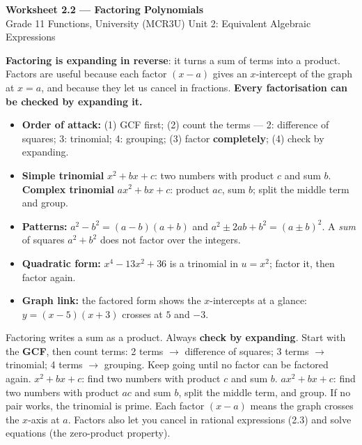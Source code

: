 \documentclass[11pt]{article}
\begin{document}
\begin{center}
{\LARGE\bfseries\color{titleblue}Worksheet 2.2 --- Factoring Polynomials}\\[2pt]
{\small Grade 11 Functions, University (MCR3U) \textperiodcentered{} Unit 2: Equivalent Algebraic Expressions}
\end{center}

\begin{ideabox}
\textbf{Factoring is expanding in reverse}: it turns a sum of terms into a product. Factors are useful because each factor $(x-a)$ gives an $x$-intercept of the graph at $x=a$, and because they let us cancel in fractions. \textbf{Every factorisation can be checked by expanding it.}
\begin{itemize}[leftmargin=*,itemsep=2pt]
  \item \textbf{Order of attack:} (1) GCF first; (2) count the terms --- 2: difference of squares; 3: trinomial; 4: grouping; (3) factor \textbf{completely}; (4) check by expanding.
  \item \textbf{Simple trinomial} $x^2+bx+c$: two numbers with product $c$ and sum $b$. \textbf{Complex trinomial} $ax^2+bx+c$: product $ac$, sum $b$; split the middle term and group.
  \item \textbf{Patterns:} $a^2-b^2=(a-b)(a+b)$ and $a^2\pm2ab+b^2=(a\pm b)^2$. A \emph{sum} of squares $a^2+b^2$ does not factor over the integers.
  \item \textbf{Quadratic form:} $x^4-13x^2+36$ is a trinomial in $u=x^2$; factor it, then factor again.
  \item \textbf{Graph link:} the factored form shows the $x$-intercepts at a glance: $y=(x-5)(x+3)$ crosses at $5$ and $-3$.
\end{itemize}
\end{ideabox}

\begin{learnbox}
Factoring writes a sum as a product. Always \textbf{check by expanding}. Start with the \textbf{GCF}, then count terms: 2 terms $\to$ difference of squares; 3 terms $\to$ trinomial; 4 terms $\to$ grouping. Keep going until no factor can be factored again.
$x^2+bx+c$: find two numbers with product $c$ and sum $b$. $ax^2+bx+c$: find two numbers with product $ac$ and sum $b$, split the middle term, and group. If no pair works, the trinomial is prime.
Each factor $(x-a)$ means the graph crosses the $x$-axis at $a$. Factors also let you cancel in rational expressions (2.3) and solve equations (the zero-product property).
\end{learnbox}
\end{document}
